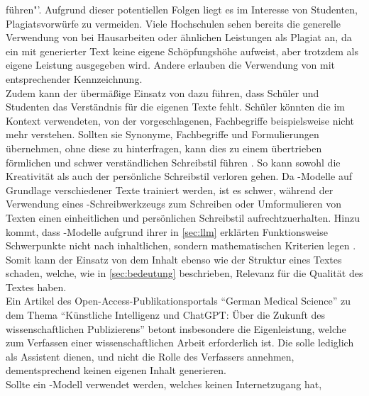 \documentclass[../main.tex]{subfiles}
\begin{document}
führen"'\cite{Plagiate}. Aufgrund dieser potentiellen Folgen liegt es im Interesse von Studenten, Plagiatsvorwürfe zu vermeiden. Viele Hochschulen sehen bereits die generelle Verwendung von  bei Hausarbeiten 
oder ähnlichen Leistungen als Plagiat an, da ein mit  generierter Text keine eigene Schöpfungshöhe aufweist, aber trotzdem als eigene Leistung ausgegeben wird. Andere erlauben die Verwendung von 
 mit entsprechender Kennzeichnung. \cite{Plagiate}\\
Zudem kann der übermäßige Einsatz von  dazu führen, dass Schüler und Studenten das Verständnis für die eigenen Texte fehlt. Schüler könnten die im 
Kontext verwendeten, von der  vorgeschlagenen, Fachbegriffe beispielsweise nicht mehr verstehen. Sollten sie Synonyme, Fachbegriffe und Formulierungen 
übernehmen, ohne diese zu hinterfragen, kann dies zu einem übertrieben förmlichen und schwer verständlichen Schreibstil führen \cite{teachers}. 
So kann sowohl die Kreativität als auch der persönliche Schreibstil verloren gehen. Da -Modelle auf Grundlage verschiedener Texte trainiert werden, ist es
schwer, während der Verwendung eines -Schreibwerkzeugs zum Schreiben oder Umformulieren von Texten einen einheitlichen und persönlichen Schreibstil aufrechtzuerhalten\cite{creativeWriting}. Hinzu kommt,
dass -Modelle aufgrund ihrer in \autoref{sec:llm} erklärten Funktionsweise Schwerpunkte nicht nach inhaltlichen, sondern mathematischen Kriterien legen \cite{berensBolk}. Somit kann der 
Einsatz von  dem Inhalt ebenso wie der Struktur eines Textes schaden, welche, wie in \autoref{sec:bedeutung} beschrieben, Relevanz für die Qualität des Textes haben.\\
Ein Artikel des Open-Access-Publikationsportals "`German Medical Science"' zu dem Thema "`Künstliche Intelligenz und ChatGPT: Über die Zukunft des wissenschaftlichen Publizierens"'
betont insbesondere die Eigenleistung, welche zum Verfassen einer wissenschaftlichen Arbeit erforderlich ist. Die  solle lediglich als Assistent dienen, und
nicht die Rolle des Verfassers annehmen, dementsprechend keinen eigenen Inhalt generieren. \cite{ZukunftWissenschaftlichesPublizieren} \\ Sollte ein -Modell verwendet werden, welches keinen Internetzugang hat,
\end{document}
